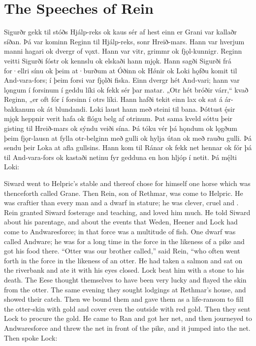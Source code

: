 \sectionline

\section{The Speeches of Rein}

\bpg\bpa Sigurðr gekk til stóðs Hjálp-reks ok kaus sér af hest einn er Grani var kallaðr síðan. Þá var kominn Reginn til Hjálp-reks, sonr Hreið-mars. Hann var hverjum manni hagari ok dvergr of vǫxt. Hann var vitr, grimmr ok fjǫl-kunnigr. Reginn veitti Sigurði fóstr ok kennslu ok elskaði hann mjǫk. Hann sagði Sigurði frá for·ellri sínu ok þeim at·burðum at Óðinn ok Hǿnir ok Loki hǫfðu komit til And-vara-fors; í þeim forsi var fjǫlði fiska. Einn dvergr hét And-vari; hann var lǫngum í forsinum í geddu líki ok fekk sér þar matar. „Otr hét bróðir várr,“ kvað Reginn, „er oft fór í forsinn í otrs líki. Hann hafði tekit einn lax ok sat á ár-bakkanum ok át blundandi. Loki laust hann með steini til bana. Þóttust ę́sir mjǫk heppnir verit hafa ok flógu belg af otrinum. Þat sama kveld sóttu þeir gisting til Hreið-mars ok sýndu veiði sína. Þá tóku vér þá hǫndum ok lǫgðum þeim fjǫr-lausn at fylla otr-belginn með gulli ok hylja útan ok með rauðu gulli. Þá sendu þeir Loka at afla gullsins. Hann kom til Ránar ok fekk net hennar ok fór þá til And-vara-fors ok kastaði netinu fyr gedduna en hon hljóp í netit. Þá mę́lti Loki:\epa

\bpb Siward went to Helpric’s stable and thereof chose for himself one horse which was thenceforth called Grane. Then Rein, son of Rethmar, was come to Helpric. He was craftier than every man and a dwarf in stature; he was clever, cruel and . Rein granted Siward fosterage and teaching, and loved him much. He told Siward about his parentage, and about the events that Weden, Heener and Lock had come to Andwaresforce; in that force was a multitude of fish. One dwarf was called Andware; he was for a long time in the force in the likeness of a pike and got his food there. “Otter was our brother called,” said Rein, “who often went forth in the force in the likeness of an otter. He had taken a salmon and sat on the riverbank and ate it with his eyes closed. Lock beat him with a stone to his death. The Eese thought themselves to have been very lucky and flayed the skin from the otter. The same evening they sought lodgings at Rethmar’s house, and showed their catch. Then we bound them and gave them as a life-ransom to fill the otter-skin with gold and cover even the outside with red gold. Then they sent Lock to procure the gold. He came to Ran and got her net, and then journeyed to Andwaresforce and threw the net in front of the pike, and it jumped into the net. Then spoke Lock:\epb\epg


